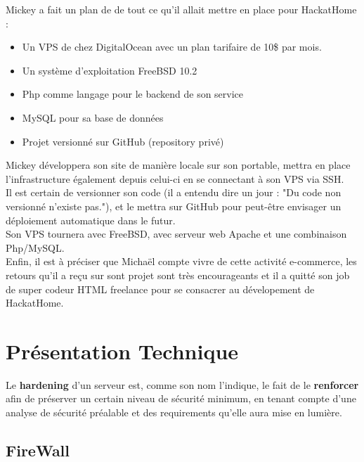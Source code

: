 \documentclass[a4paper,10pt,final,fleqn]{article}
\begin{document}
		Mickey a fait un plan de de tout ce qu'il allait mettre en place pour HackatHome : \\

		\begin{itemize}
			\item Un VPS de chez DigitalOcean avec un plan tarifaire de 10\$ par mois.
			\item Un système d'exploitation FreeBSD 10.2
			\item Php comme langage pour le backend de son service
			\item MySQL pour sa base de données
			\item Projet versionné sur GitHub (repository privé)\\
			
		\end{itemize}

		Mickey développera son site de manière locale sur son portable, mettra en place l'infrastructure également depuis celui-ci en se connectant à son VPS via SSH.\\
		Il est certain de versionner son code (il a entendu dire un jour : "Du code non versionné n'existe pas."), et le mettra sur GitHub pour peut-être envisager un déploiement automatique dans le futur.\\
		Son VPS tournera avec FreeBSD, avec serveur web Apache et une combinaison Php/MySQL.\\

		Enfin, il est à préciser que Michaël compte vivre de cette activité e-commerce, les retours qu'il a reçu sur sont projet sont très encourageants et il a quitté son job de super codeur HTML freelance pour se consacrer au dévelopement de HackatHome.\\

	\section{Présentation Technique}

		Le \textbf{hardening} d'un serveur est, comme son nom l'indique, le fait de le \textbf{renforcer} afin de préserver un certain niveau de sécurité minimum, en tenant compte d'une analyse de sécurité préalable et des requirements qu'elle aura mise en lumière.\\

		\subsection{FireWall}
\end{document}
